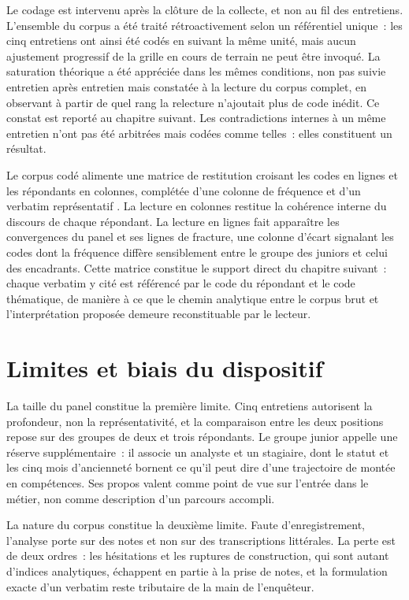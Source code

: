 Le codage est intervenu après la clôture de la collecte, et non au fil des entretiens.
L'ensemble du corpus a été traité rétroactivement selon un référentiel unique~: les cinq
entretiens ont ainsi été codés en suivant la même unité, mais aucun ajustement progressif de la
grille en cours de terrain ne peut être invoqué. La saturation théorique
\cite{glaser1967} a été appréciée dans les mêmes conditions, non pas suivie entretien
après entretien mais constatée à la lecture du corpus complet, en observant à partir de
quel rang la relecture n'ajoutait plus de code inédit. Ce constat est reporté au
chapitre suivant. Les
contradictions internes à un même entretien n'ont pas été arbitrées mais codées comme
telles~: elles constituent un résultat.

Le corpus codé alimente une matrice de restitution croisant les codes en lignes et les
répondants en colonnes, complétée d'une colonne de fréquence et d'un verbatim
représentatif \cite{miles2003}. La lecture en colonnes restitue la cohérence interne
du discours de chaque répondant. La lecture en lignes fait apparaître les
convergences du panel et ses lignes de fracture, une colonne d'écart signalant les
codes dont la fréquence diffère sensiblement entre le groupe des juniors et celui des
encadrants. Cette matrice constitue le support direct du chapitre suivant~: chaque
verbatim y cité est référencé par le code du répondant et le code thématique, de
manière à ce que le chemin analytique entre le corpus brut et l'interprétation proposée
demeure reconstituable par le lecteur.

\section{Limites et biais du dispositif}

La taille du panel constitue la première limite. Cinq entretiens autorisent la
profondeur, non la représentativité, et la comparaison entre les deux positions repose
sur des groupes de deux et trois répondants. Le groupe junior appelle une réserve
supplémentaire~: il associe un analyste et un stagiaire, dont le statut et les cinq mois
d'ancienneté bornent ce qu'il peut dire d'une trajectoire de montée en compétences. Ses
propos valent comme point de vue sur l'entrée dans le métier, non comme description d'un
parcours accompli.

La nature du corpus constitue la deuxième limite. Faute d'enregistrement, l'analyse
porte sur des notes et non sur des transcriptions littérales. La perte est de deux
ordres~: les hésitations et les ruptures de construction, qui sont autant d'indices
analytiques, échappent en partie à la prise de notes, et la formulation exacte d'un
verbatim reste tributaire de la main de l'enquêteur.

